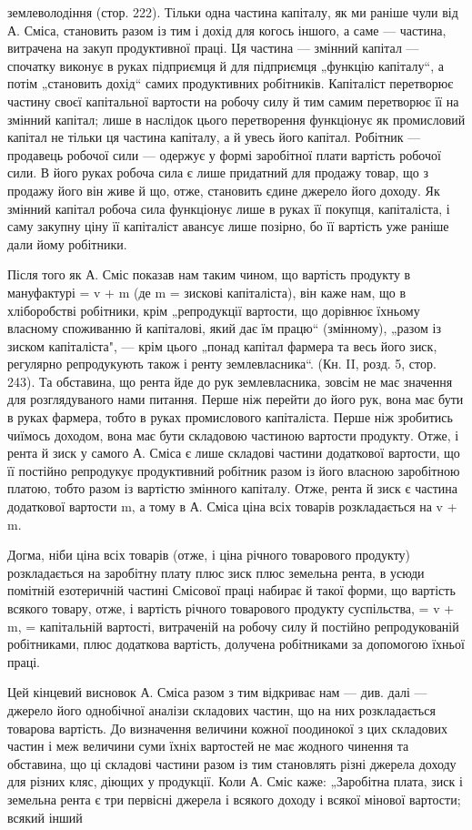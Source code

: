 \parcont{}  %
землеволодіння (стор. 222). Тільки одна частина капіталу, як ми
раніше чули від А. Сміса, становить разом із тим і дохід для когось
іншого, а саме — частина, витрачена на закуп продуктивної праці. Ця частина
— змінний капітал — спочатку виконує в руках підприємця й для підприємця
„функцію капіталу“, а потім „становить дохід“ самих продуктивних
робітників. Капіталіст перетворює частину своєї капітальної вартости на
робочу силу й тим самим перетворює її на змінний капітал; лише в наслідок
цього перетворення функціонує як промисловий капітал не тільки ця частина
капіталу, а й увесь його капітал. Робітник — продавець робочої сили — одержує
у формі заробітної плати вартість робочої сили. В його руках робоча
сила є лише придатний для продажу товар, що з продажу його він живе
й що, отже, становить єдине джерело його доходу. Як змінний капітал
робоча сила функціонує лише в руках її покупця, капіталіста, і саму
закупну ціну її капіталіст авансує лише позірно, бо її вартість уже раніше
дали йому робітники.

Після того як А. Сміс показав нам таким чином, що вартість продукту
в мануфактурі = v + m (де m = зискові капіталіста), він каже нам,
що в хліборобстві робітники, крім „репродукції вартости, що дорівнює
їхньому власному споживанню й капіталові, який дає їм працю“ (змінному),
„разом із зиском капіталіста", — крім цього „понад капітал фармера
та весь його зиск, регулярно репродукують також і ренту землевласника“.
(Кн. II, розд. 5, стор. 243). Та обставина, що рента
йде до рук землевласника, зовсім не має значення для розглядуваного
нами питання. Перше ніж перейти до його рук, вона має бути в
руках фармера, тобто в руках промислового капіталіста. Перше ніж зробитись
чиїмось доходом, вона має бути складовою частиною вартости
продукту. Отже, і рента й зиск у самого А. Сміса є лише складові частини
додаткової вартости, що її постійно репродукує продуктивний робітник
разом із його власною заробітною платою, тобто разом із вартістю
змінного капіталу. Отже, рента й зиск є частина додаткової вартости
m, а тому в А. Сміса ціна всіх товарів розкладається на v + m.

Догма, ніби ціна всіх товарів (отже, і ціна річного товарового продукту)
розкладається на заробітну плату плюс зиск плюс земельна рента, в
усюди помітній езотеричній частині Смісової праці набирає й такої форми,
що вартість всякого товару, отже, і вартість річного товарового продукту
суспільства, = v + m, = капітальній вартості, витраченій на робочу силу
й постійно репродукованій робітниками, плюс додаткова вартість, долучена
робітниками за допомогою їхньої праці.

Цей кінцевий висновок А. Сміса разом з тим відкриває нам — див.
далі — джерело його однобічної аналізи складових частин, що на них
розкладається товарова вартість. До визначення величини кожної поодинокої
з цих складових частин і меж величини суми їхніх вартостей не має
жодного чинення та обставина, що ці складові частини разом із тим
становлять різні джерела доходу для різних кляс, діющих у продукції.
Коли А. Сміс каже: „Заробітна плата, зиск і земельна рента є три первісні
джерела і всякого доходу і всякої мінової вартости; всякий інший
\parbreak{}  %
